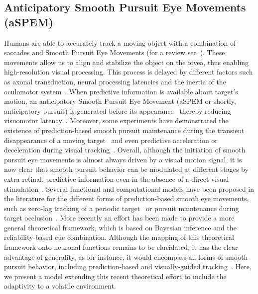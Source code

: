 \documentclass[10pt,letterpaper]{article}
\newcommand{\citep}[1]{\cite{#1}}
\newcommand{\citet}[1]{\cite{#1}}
\begin{document}
\subsection{Anticipatory Smooth Pursuit Eye Movements (aSPEM)}
Humans are able to accurately track a moving object
with a combination of saccades and
Smooth Pursuit Eye Movements (for a review see~\citet{Krauzlis2008}).
These movements allow us to align and
stabilize the object on the fovea,
thus enabling high-resolution visual processing.
This process is delayed by different factors such as axonal transduction,
neural processing latencies and the inertia of the oculomotor system~\citep{Krauzlis89}.
When predictive information is available about target's motion,
an anticipatory Smooth Pursuit Eye Movement (aSPEM or shortly, anticipatory pursuit)
is generated before its appearance~\citep{Westheimer1954, Kowler1979a, Kowler1979b}
thereby reducing visuomotor latency~\citep{PerrinetAdamasFriston2014}.
Moreover, some experiments have demonstrated the existence
of prediction-based smooth pursuit maintenance during
the transient disappearance of a moving target~\citep{Badler2006,BeckerFuchs1985,OrbandeXivryMissalLefevre_JOV2012}
and even predictive acceleration or deceleration during visual tracking~\citep{BeckerFuchs1985,CollinsBarnes2009}.
Overall, although the initiation of smooth pursuit eye movements
is almost always driven by a visual motion signal,
it is now clear that smooth pursuit behavior
can be modulated at different stages by extra-retinal, predictive information even in the absence of a direct visual stimulation~\citep{Barnes2008}.
Several functional and computational models have been proposed in the literature for the different forms of prediction-based smooth eye movements, such as zero-lag tracking of a periodic target~\citep{DallosJones1963} or pursuit maintenance during target occlusion~\citep{CollinsBarnes2009}. More recently an effort has been made to provide a more general theoretical framework, which is based on Bayesian inference and the reliability-based cue combination. Although the mapping of this theoretical framework onto neuronal functions remains to be elucidated, it has the clear advantage of generality, as for instance, it would encompass all forms of smooth pursuit behavior, including prediction-based and visually-guided tracking~\citep{Bogadhi2013,Orban2013,Deravet_JOV2018,Darlington_NatNeu2018}. Here, we present a model extending this recent theoretical effort to include the adaptivity to a volatile environment.
\end{document}
